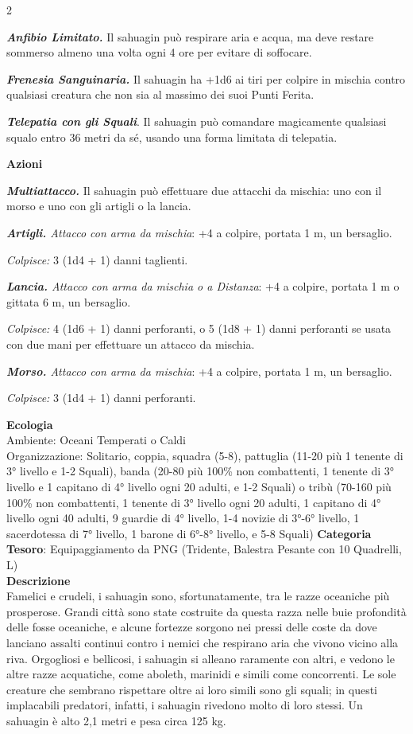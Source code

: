 \begin{multicols}{2}
{\emph{\textbf{Anfibio Limitato.}} Il sahuagin può respirare aria e acqua, ma deve restare sommerso almeno una volta ogni 4 ore per evitare di soffocare.

\emph{\textbf{Frenesia Sanguinaria.}} Il sahuagin ha +1d6 ai tiri per colpire in mischia contro qualsiasi creatura che non sia al massimo dei suoi Punti Ferita.

\emph{\textbf{Telepatia con gli Squali}}. Il sahuagin può comandare magicamente qualsiasi squalo entro 36 metri da sé, usando una forma limitata di telepatia.

\textbf{Azioni}

\emph{\textbf{Multiattacco.}} Il sahuagin può effettuare due attacchi da mischia: uno con il morso e uno con gli artigli o la lancia.

\emph{\textbf{Artigli.} Attacco con arma da mischia}: +4 a colpire, portata 1 m, un bersaglio.

\emph{Colpisce:} 3 (1d4 + 1) danni taglienti.

\emph{\textbf{Lancia.} Attacco con arma da mischia o a Distanza}: +4 a colpire, portata 1 m o gittata 6 m, un bersaglio.

\emph{Colpisce:} 4 (1d6 + 1) danni perforanti, o 5 (1d8 + 1) danni perforanti se usata con due mani per effettuare un attacco da mischia.

\emph{\textbf{Morso.} Attacco con arma da mischia}: +4 a colpire, portata 1 m, un bersaglio.

\emph{Colpisce:} 3 (1d4 + 1) danni perforanti.

\textbf{Ecologia}\\
Ambiente: Oceani Temperati o Caldi\\
Organizzazione: Solitario, coppia, squadra (5-8), pattuglia (11-20 più 1 tenente di 3° livello e 1-2 Squali), banda (20-80 più 100\% non combattenti, 1 tenente di 3° livello e 1 capitano di 4° livello ogni 20 adulti, e 1-2 Squali) o tribù (70-160 più 100\% non combattenti, 1 tenente di 3° livello ogni 20 adulti, 1 capitano di 4° livello ogni 40 adulti, 9 guardie di 4° livello, 1-4 novizie di 3°-6° livello, 1 sacerdotessa di 7° livello, 1 barone di 6°-8° livello, e 5-8 Squali)
\textbf{Categoria Tesoro}: Equipaggiamento da PNG (Tridente, Balestra Pesante con 10 Quadrelli, L)\\
\textbf{Descrizione}\\
Famelici e crudeli, i sahuagin sono, sfortunatamente, tra le razze oceaniche più prosperose. Grandi città sono state costruite da questa razza nelle buie profondità delle fosse oceaniche, e alcune fortezze sorgono nei pressi delle coste da dove lanciano assalti continui contro i nemici che respirano aria che vivono vicino alla riva. Orgogliosi e bellicosi, i sahuagin si alleano raramente con altri, e vedono le altre razze acquatiche, come aboleth, marinidi e simili come concorrenti. Le sole creature che sembrano rispettare oltre ai loro simili sono gli squali; in questi implacabili predatori, infatti, i sahuagin rivedono molto di loro stessi. Un sahuagin è alto 2,1 metri e pesa circa 125 kg.

}
\end{multicols}
